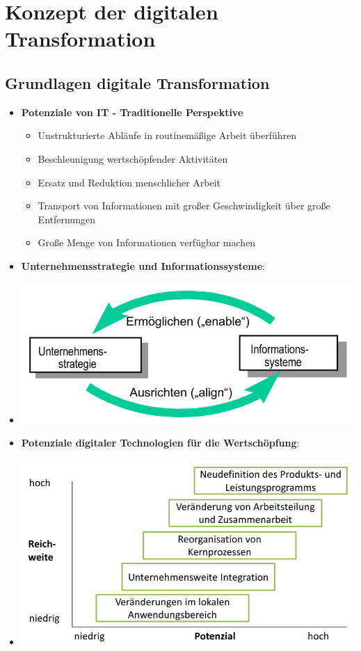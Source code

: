 \documentclass[12pt,a4paper]{article}
\author{Pauline Speckmann}
\begin{document}
\setcounter{section}{3}
\section{Konzept der digitalen Transformation}


\vspace*{1cm}
\subsection{Grundlagen digitale Transformation} %
\begin{itemize}
   \item \textbf{Potenziale von IT - Traditionelle Perspektive}
      \begin{itemize}
			\item Unstrukturierte Abläufe in routinemäßige Arbeit überführen
			\item Beschleunigung wertschöpfender Aktivitäten
			\item Ersatz und Reduktion menschlicher Arbeit
			\item Transport von Informationen mit großer Geschwindigkeit über große Entfernungen
			\item Große Menge von Informationen verfügbar machen
      \end{itemize}

   \item \textbf{Unternehmensstrategie und Informationssysteme}:
   \item[] \includegraphics[scale=0.45]{UIS.png}
   
   \item \textbf{Potenziale digitaler Technologien für die Wertschöpfung}:
   \item[] \includegraphics[scale=0.5]{Potenziale.png}
   

\end{itemize}
\end{document}
